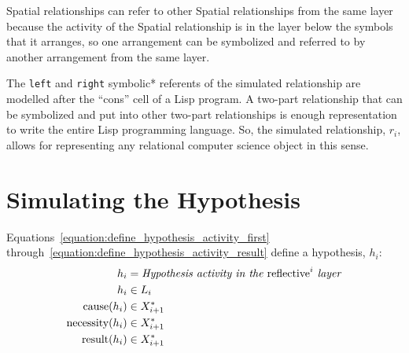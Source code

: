 Spatial relationships can refer to other Spatial relationships from
the same layer because the activity of the Spatial relationship is in
the layer below the symbols that it arranges, so one arrangement can
be symbolized and referred to by another arrangement from the same
layer.

The {\tt left} and {\tt right} symbolic* referents of the simulated
relationship are modelled after the ``cons'' cell of a Lisp program.
A two-part relationship that can be symbolized and put into other
two-part relationships is enough representation to write the entire
Lisp programming language.  So, the simulated relationship, $r_i$,
allows for representing any relational computer science object in this
sense.

%

\section{Simulating the Hypothesis}

Equations~\ref{equation:define_hypothesis_activity_first}
through~\ref{equation:define_hypothesis_activity_result} define a
hypothesis, $h_i$:
\begin{align}
\label{equation:define_hypothesis_activity_first}
                  h_i &= \text{\emph{Hypothesis activity in the} reflective}^i\text{\emph{ layer}} \\
                  h_i &\in L_i \\
\label{equation:define_hypothesis_activity_cause}
    \text{cause}(h_i) &\in X_{i+1}^* \\
\label{equation:define_hypothesis_activity_necessity}
\text{necessity}(h_i) &\in X_{i+1}^* \\
\label{equation:define_hypothesis_activity_result}
   \text{result}(h_i) &\in X_{i+1}^*
\end{align}

